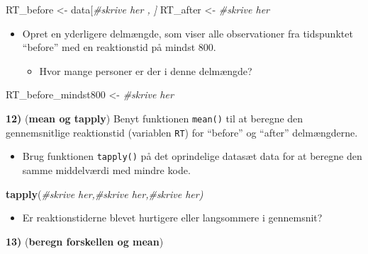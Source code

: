 \documentclass[
]{book}
\newenvironment{Shaded}{\begin{snugshade}}{\end{snugshade}}
\newcommand{\CommentTok}[1]{\textcolor[rgb]{0.56,0.35,0.01}{\textit{#1}}}
\newcommand{\FunctionTok}[1]{\textcolor[rgb]{0.13,0.29,0.53}{\textbf{#1}}}
\newcommand{\NormalTok}[1]{#1}
\newcommand{\OtherTok}[1]{\textcolor[rgb]{0.56,0.35,0.01}{#1}}
\providecommand{\tightlist}{%
  \setlength{\itemsep}{0pt}\setlength{\parskip}{0pt}}
\begin{document}
\begin{Shaded}
\begin{Highlighting}[]
\NormalTok{RT\_before }\OtherTok{\textless{}{-}}\NormalTok{ data[}\CommentTok{\#skrive her , ]}
\NormalTok{RT\_after }\OtherTok{\textless{}{-}} \CommentTok{\#skrive her}
\end{Highlighting}
\end{Shaded}

\begin{itemize}
\tightlist
\item
  Opret en yderligere delmængde, som viser alle observationer fra tidspunktet ``before'' med en reaktionstid på mindst 800.

  \begin{itemize}
  \tightlist
  \item
    Hvor mange personer er der i denne delmængde?
  \end{itemize}
\end{itemize}

\begin{Shaded}
\begin{Highlighting}[]
\NormalTok{RT\_before\_mindst800 }\OtherTok{\textless{}{-}} \CommentTok{\#skrive her}
\end{Highlighting}
\end{Shaded}

\textbf{12)} (\textbf{mean og tapply}) Benyt funktionen \texttt{mean()} til at beregne den gennemsnitlige reaktionstid (variablen \texttt{RT}) for ``before'' og ``after'' delmængderne.

\begin{itemize}
\tightlist
\item
  Brug funktionen \texttt{tapply()} på det oprindelige datasæt data for at beregne den samme middelværdi med mindre kode.
\end{itemize}

\begin{Shaded}
\begin{Highlighting}[]
\FunctionTok{tapply}\NormalTok{(}\CommentTok{\#skrive her,\#skrive her,\#skrive her)}
\end{Highlighting}
\end{Shaded}

\begin{itemize}
\tightlist
\item
  Er reaktionstiderne blevet hurtigere eller langsommere i gennemsnit?
\end{itemize}

\textbf{13)} (\textbf{beregn forskellen og mean})
\end{document}
